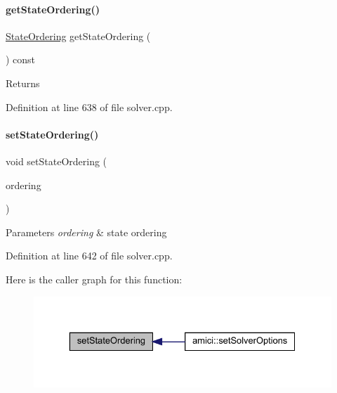 \paragraph{\texorpdfstring{get\+State\+Ordering()}{getStateOrdering()}}
{\footnotesize\ttfamily \mbox{\hyperlink{namespaceamici_a890d968060d6d830aeed98dbeb04447f}{State\+Ordering}} get\+State\+Ordering (\begin{DoxyParamCaption}{ }\end{DoxyParamCaption}) const}

\begin{DoxyReturn}{Returns}

\end{DoxyReturn}


Definition at line 638 of file solver.\+cpp.

\mbox{\label{classamici_1_1_solver_aa22ae4579c350a6f3fae2e3b5a0da1de}} 
\paragraph{\texorpdfstring{set\+State\+Ordering()}{setStateOrdering()}}
{\footnotesize\ttfamily void set\+State\+Ordering (\begin{DoxyParamCaption}\item[{\mbox{\hyperlink{namespaceamici_a890d968060d6d830aeed98dbeb04447f}{State\+Ordering}}}]{ordering }\end{DoxyParamCaption})}


\begin{DoxyParams}{Parameters}
{\em ordering} & state ordering \\
\hline
\end{DoxyParams}


Definition at line 642 of file solver.\+cpp.

Here is the caller graph for this function\+:
\nopagebreak
\begin{figure}[H]
\begin{center}
\leavevmode
\includegraphics[width=329pt]{classamici_1_1_solver_aa22ae4579c350a6f3fae2e3b5a0da1de_icgraph}
\end{center}
\end{figure}
\mbox{\label{classamici_1_1_solver_ae1e9c3c5e59413ae25fb67c29983e3f3}} 

